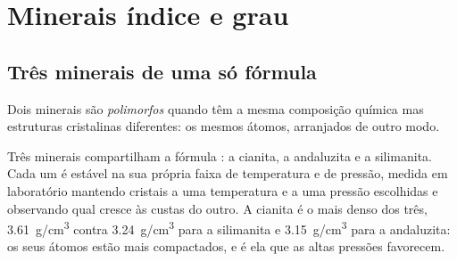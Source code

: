 \section{Minerais índice e grau}

\subsection{Três minerais de uma só fórmula}

\begin{definition}[Polimorfo]\label{def:g12:metamorphic-rocks:polymorph}
Dois minerais são \emph{polimorfos} quando têm a mesma
composição química mas estruturas cristalinas diferentes: os mesmos átomos,
arranjados de outro modo.
\end{definition}

Três minerais compartilham a fórmula : a cianita, a andaluzita e
a silimanita. Cada um é estável na sua própria faixa de temperatura e de
pressão, medida em laboratório mantendo cristais a uma temperatura e a uma
pressão escolhidas e observando qual  cresce às custas do outro. A
cianita é o mais denso dos três,
\qty{3.61}{g/cm^3} contra \qty{3.24}{g/cm^3} para a silimanita e
\qty{3.15}{g/cm^3} para a andaluzita: os seus átomos estão mais compactados,
e é ela que as altas pressões favorecem.

